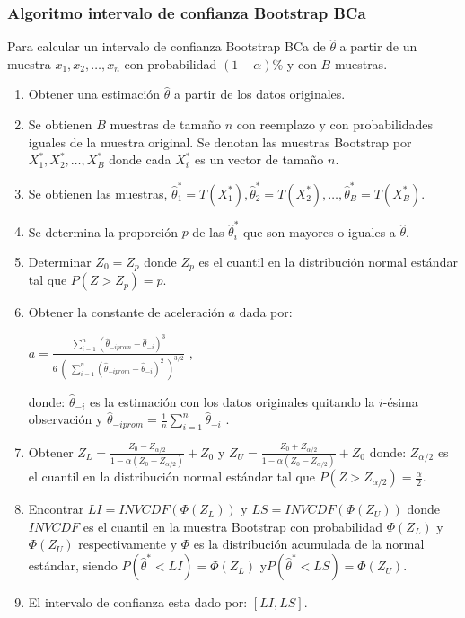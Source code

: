 \subsubsection{Algoritmo intervalo de confianza Bootstrap BCa}

Para calcular un intervalo de confianza Bootstrap BCa de $\hat{\theta}$ a partir de un muestra $x_{1}, x_{2}, \dots, x_{n}$ con probabilidad $(1-\alpha)$\% y con $B$ muestras.


\begin{enumerate}
 \item Obtener una estimación $\hat{\theta}$ a partir de los datos originales.
 
\item Se obtienen $B$ muestras de tamaño $n$ con reemplazo y con probabilidades iguales de la muestra original. Se denotan las muestras Bootstrap por $X^{*}_{1}, X^{*}_{2},  \dots, X^{*}_{B}$ donde cada $X^{*}_{i}$ es un vector de tamaño $n$.

\item Se obtienen las muestras, $\hat{\theta}^{*}_{1} = T (X^{*}_{1}) , \hat{\theta}^{*}_{2} = T (X^{*}_{2}), \dots,\hat{\theta}^{*}_{B} = T (X^{*}_{B})$.

\item Se determina la proporción $p$ de las  $\hat{\theta}^{*}_{i}$ que son mayores o iguales a $\hat{\theta}$.

\item  Determinar $Z_{0} = Z_{p}$ donde $Z_{p}$ es el cuantil en la distribución normal estándar tal que $P(Z > Z_{p}) = p$.

\item  Obtener la constante de aceleración $a$ dada por:
\begin{center}
 \Large $ a = \frac{\sum_{i=1}^{n}  (\hat{\theta}_{-iprom}  - \hat{\theta}_{-i})^{3} }{ 6 \; (\; \sum_{i=1}^{n}  ( \hat{\theta}_{-iprom}  - \hat{\theta}_{-i})^{2} \; )^{3/2}} $ ,
\end{center}

 donde: $\hat{\theta}_{-i}$ es la estimación con los datos originales quitando la $i$-ésima observación y {\normalsize $\hat{\theta}_{-iprom} = \frac{1}{n} \sum_{i=1}^{n}\hat{\theta}_{-i}$} .
 
 \item Obtener {\large $Z_{L} = \frac{Z_{0} - Z_{\alpha/2}}{ 1- \alpha ( Z_{0} - Z_{\alpha/2})} + Z_{0}  $}   y {\large $Z_{U} = \frac{Z_{0} + Z_{\alpha/2}}{ 1- \alpha ( Z_{0} - Z_{\alpha/2})} + Z_{0}  $}  donde: $Z_{\alpha /2}$ es el cuantil en la
 distribución normal estándar tal que $P(Z > Z_{\alpha / 2}) = \frac{\alpha}{2}$.
 
 
 \item Encontrar $LI = INVCDF( \Phi(Z_{L}))$ y $LS = INVCDF( \Phi(Z_{U}))$ donde $INVCDF$ es el cuantil en la muestra Bootstrap con probabilidad $ \Phi(Z_{L})$ y $ \Phi(Z_{U})$ respectivamente y $\Phi$ es la distribución acumulada de la normal estándar, siendo $P(\hat{\theta}^{*} < LI) = \Phi(Z_{L})$ y$P(\hat{\theta}^{*} < LS) = \Phi(Z_{U})$.
 
\item El intervalo de confianza esta dado por: $[LI, LS]$.
\end{enumerate}


